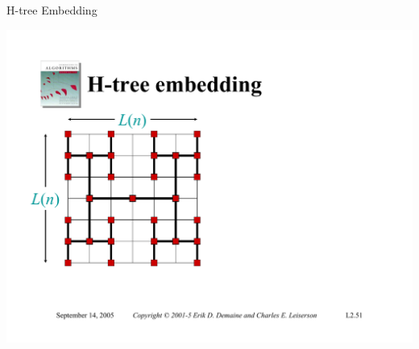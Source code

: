 \documentclass{beamer}
\begin{document}
\begin{frame}{H-tree Embedding}
    \begin{minipage}{0.48\textwidth}
        \centering
        \includegraphics[width=\textwidth, trim={0.45cm 2.25cm 13.25cm 4.25cm}, clip]{pages/lec3_51}
    \end{minipage}
    \hfill
    \begin{minipage}{0.48\textwidth}
    \end{minipage}
\end{frame}
\end{document}
